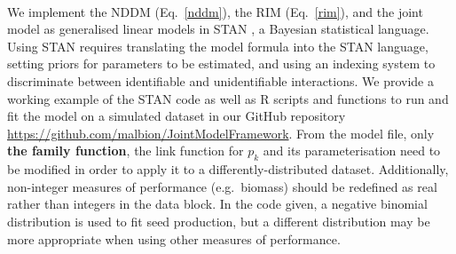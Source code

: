 \documentclass[a4,12pt]{article}
\begin{document}
\begin{refsection}
        \paragraph{}        
        We implement the NDDM (Eq.~\ref{nddm}), the RIM (Eq.~\ref{rim}), and the joint model as generalised linear models in STAN \parencite{Carpenter2017}, a Bayesian statistical language. Using STAN requires translating the model formula into the STAN language, setting priors for parameters to be estimated, and using an indexing system to discriminate between identifiable and unidentifiable interactions. We provide a working example of the STAN code as well as R scripts and functions to run and fit the model on a simulated dataset in our GitHub repository \url{https://github.com/malbion/JointModelFramework}.
        From the model file, only \textbf{the family function}, the link function for $p_k$ and its parameterisation need to be modified in order to apply it to a differently-distributed dataset. Additionally, non-integer measures of performance (e.g.\ biomass) should be redefined as real rather than integers in the data block. In the code given, a negative binomial distribution is used to fit seed production, but a different distribution may be more appropriate when using other measures of performance.   




\end{refsection}
\end{document}
